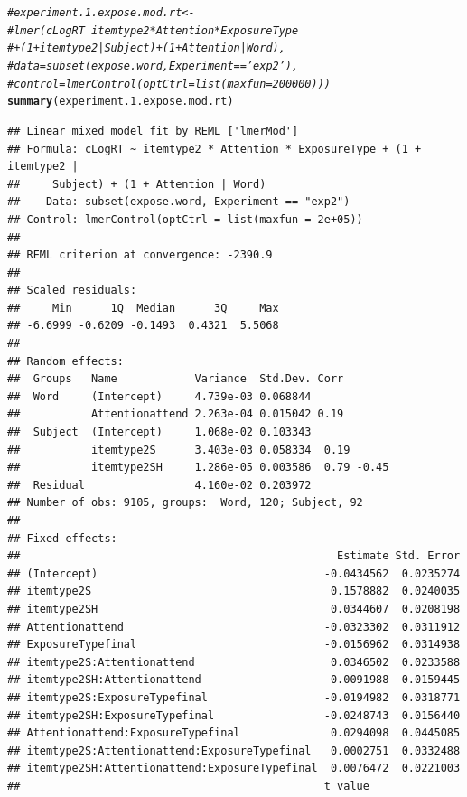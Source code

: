 \documentclass[11pt]{article}\usepackage[]{graphicx}\usepackage[]{color}
\makeatletter
\newcommand{\hlcom}[1]{\textcolor[rgb]{0.678,0.584,0.686}{\textit{#1}}}%
\newcommand{\hlstd}[1]{\textcolor[rgb]{0.345,0.345,0.345}{#1}}%
\newcommand{\hlkwd}[1]{\textcolor[rgb]{0.737,0.353,0.396}{\textbf{#1}}}%
\newenvironment{kframe}{%
 \def\at@end@of@kframe{}%
 \ifinner\ifhmode%
  \def\at@end@of@kframe{\end{minipage}}%
  \begin{minipage}{\columnwidth}%
 \fi\fi%
 \def\FrameCommand##1{\hskip\@totalleftmargin \hskip-\fboxsep
 \colorbox{shadecolor}{##1}\hskip-\fboxsep
     \hskip-\linewidth \hskip-\@totalleftmargin \hskip\columnwidth}%
 \MakeFramed {\advance\hsize-\width
   \@totalleftmargin\z@ \linewidth\hsize
   \@setminipage}}%
 {\par\unskip\endMakeFramed%
 \at@end@of@kframe}
\newenvironment{knitrout}{}{} %
\makeatother
\begin{document}
\begin{knitrout}\footnotesize
{}\color{fgcolor}\begin{kframe}
\begin{alltt}
 \hlcom{#experiment.1.expose.mod.rt <- }
 \hlcom{#lmer(cLogRT ~ itemtype2*Attention*ExposureType }
 \hlcom{#+ (1+itemtype2|Subject) + (1+Attention|Word),}
 \hlcom{#data = subset(expose.word, Experiment == 'exp2'), }
 \hlcom{#control = lmerControl(optCtrl = list(maxfun = 200000) ))}
 \hlkwd{summary}\hlstd{(experiment.1.expose.mod.rt)}
\end{alltt}
\begin{verbatim}
## Linear mixed model fit by REML ['lmerMod']
## Formula: cLogRT ~ itemtype2 * Attention * ExposureType + (1 + itemtype2 |  
##     Subject) + (1 + Attention | Word)
##    Data: subset(expose.word, Experiment == "exp2")
## Control: lmerControl(optCtrl = list(maxfun = 2e+05))
## 
## REML criterion at convergence: -2390.9
## 
## Scaled residuals: 
##     Min      1Q  Median      3Q     Max 
## -6.6999 -0.6209 -0.1493  0.4321  5.5068 
## 
## Random effects:
##  Groups   Name            Variance  Std.Dev. Corr       
##  Word     (Intercept)     4.739e-03 0.068844            
##           Attentionattend 2.263e-04 0.015042 0.19       
##  Subject  (Intercept)     1.068e-02 0.103343            
##           itemtype2S      3.403e-03 0.058334  0.19      
##           itemtype2SH     1.286e-05 0.003586  0.79 -0.45
##  Residual                 4.160e-02 0.203972            
## Number of obs: 9105, groups:  Word, 120; Subject, 92
## 
## Fixed effects:
##                                                 Estimate Std. Error
## (Intercept)                                   -0.0434562  0.0235274
## itemtype2S                                     0.1578882  0.0240035
## itemtype2SH                                    0.0344607  0.0208198
## Attentionattend                               -0.0323302  0.0311912
## ExposureTypefinal                             -0.0156962  0.0314938
## itemtype2S:Attentionattend                     0.0346502  0.0233588
## itemtype2SH:Attentionattend                    0.0091988  0.0159445
## itemtype2S:ExposureTypefinal                  -0.0194982  0.0318771
## itemtype2SH:ExposureTypefinal                 -0.0248743  0.0156440
## Attentionattend:ExposureTypefinal              0.0294098  0.0445085
## itemtype2S:Attentionattend:ExposureTypefinal   0.0002751  0.0332488
## itemtype2SH:Attentionattend:ExposureTypefinal  0.0076472  0.0221003
##                                               t value

\end{verbatim}
\end{kframe}
\end{knitrout}
\end{document}
